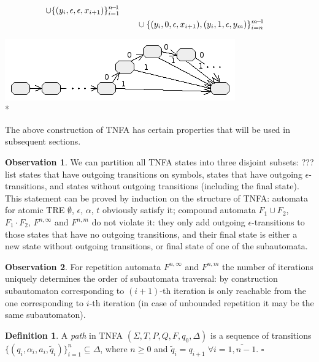 \documentclass{article}
\newenvironment{Xfig}
    {\par\medskip\noindent\minipage{\linewidth}\begin{center}}
    {\end{center}\endminipage\par\medskip}
\newcommand{\Xeq}{\!=\!}
\theoremstyle{definition}
\newtheorem{Xdef}{Definition}
\newtheorem{Xobs}{Observation}
\begin{document}
\begin{multicols}{2}
\begin{align*}
                \cup \{(y_i, \epsilon, \epsilon, x_{i+1})\}_{i=1}^{n\!-\!1} \\
                & \hphantom{\hspace{2em}}
                    \cup \{(y_i, 0, \epsilon, x_{i+1}), (y_i, 1, \epsilon, y_m)\}_{i=n}^{m\!-\!1}
    \end{align*}
%
\begin{Xfig}
\includegraphics[width=0.9\linewidth]{img/tnfa/repeat_bound.png}\\*
\end{Xfig}

The above construction of TNFA has certain properties that will be used in subsequent sections.

\begin{Xobs}\label{obs_tnfa_states}
We can partition all TNFA states into three disjoint subsets: ???list
states that have outgoing transitions on symbols,
states that have outgoing $\epsilon$-transitions,
and states without outgoing transitions (including the final state).
This statement can be proved by induction on the structure of TNFA:
automata for atomic TRE $\emptyset$, $\epsilon$, $\alpha$, $t$ obviously satisfy it;
compound automata $F_1 \cup F_2$, $F_1 \cdot F_2$, $F^{n,\infty}$ and $F^{n,m}$
do not violate it:
they only add outgoing $\epsilon$-transitions to those states that have no outgoing transitions,
and their final state is either a new state without outgoing transitions,
or final state of one of the subautomata.
\end{Xobs}

\begin{Xobs}\label{obs_tnfa_repeat}
For repetition automata $F^{n,\infty}$ and $F^{n,m}$
the number of iterations uniquely determines the order of subautomata traversal:
by construction subautomaton corresponding to $(i \!+\! 1)$-th iteration is only reachable
from the one corresponding to $i$-th iteration
(in case of unbounded repetition it may be the same subautomaton).
\end{Xobs}

    \begin{Xdef}
    A \emph{path} in TNFA $(\Sigma, T, P, Q, F, q_0, \Delta)$ is a sequence of transitions
    $\{(q_i, \alpha_i, a_i, \widetilde{q}_i)\}_{i=1}^n \subseteq \Delta$, where $n \!\geq\! 0$
    and $\widetilde{q}_i \Xeq q_{i+1} \; \forall i \Xeq \overline{1,n-1}$.
    $\square$
    \end{Xdef}


\end{multicols}
\end{document}
